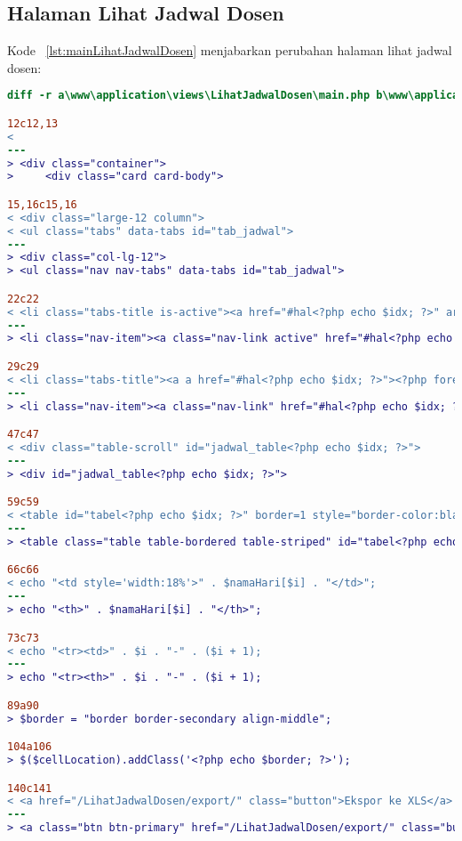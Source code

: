 \subsection{Halaman	Lihat Jadwal Dosen}
Kode ~\ref{lst:mainLihatJadwalDosen} menjabarkan perubahan halaman lihat jadwal dosen:
\begin{lstlisting}[language=diff, caption=Kode untuk Halaman Lihat Jadwal Dosen,  basicstyle=\ttfamily, frame=single,
columns=fullflexible, keepspaces=true, breaklines=true, label={lst:mainLihatJadwalDosen}]
diff -r a\www\application\views\LihatJadwalDosen\main.php b\www\application\views\LihatJadwalDosen\main.php

12c12,13
< 
---
> <div class="container">
>     <div class="card card-body">

15,16c15,16
< <div class="large-12 column">
< <ul class="tabs" data-tabs id="tab_jadwal">
---
> <div class="col-lg-12">
> <ul class="nav nav-tabs" data-tabs id="tab_jadwal">

22c22
< <li class="tabs-title is-active"><a href="#hal<?php echo $idx; ?>" aria-selected="true"><?php foreach ($currRow as $data) {
---
> <li class="nav-item"><a class="nav-link active" href="#hal<?php echo $idx; ?>" aria-selected="true"><?php foreach ($currRow as $data) {

29c29
< <li class="tabs-title"><a a href="#hal<?php echo $idx; ?>"><?php foreach ($currRow as $data) {
---
> <li class="nav-item"><a class="nav-link" href="#hal<?php echo $idx; ?>"><?php foreach ($currRow as $data) {

47c47
< <div class="table-scroll" id="jadwal_table<?php echo $idx; ?>">
---
> <div id="jadwal_table<?php echo $idx; ?>">

59c59
< <table id="tabel<?php echo $idx; ?>" border=1 style="border-color:black ; border-collapse:separate">
---
> <table class="table table-bordered table-striped" id="tabel<?php echo $idx; ?>" >

66c66
< echo "<td style='width:18%'>" . $namaHari[$i] . "</td>";
---
> echo "<th>" . $namaHari[$i] . "</th>";

73c73
< echo "<tr><td>" . $i . "-" . ($i + 1);
---
> echo "<tr><th>" . $i . "-" . ($i + 1);

89a90
> $border = "border border-secondary align-middle";

104a106
> $($cellLocation).addClass('<?php echo $border; ?>');

140c141
< <a href="/LihatJadwalDosen/export/" class="button">Ekspor ke XLS</a>
---
> <a class="btn btn-primary" href="/LihatJadwalDosen/export/" class="button">Ekspor ke XLS</a>
\end{lstlisting}

